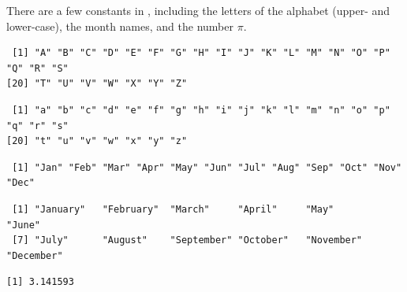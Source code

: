 There are a few constants in \R, including the letters of the alphabet (upper- and lower-case), the month names, and the number $\pi$.
\begin{knitrout}
\color{fgcolor}\begin{kframe}
\begin{alltt}
\end{alltt}
\begin{verbatim}
 [1] "A" "B" "C" "D" "E" "F" "G" "H" "I" "J" "K" "L" "M" "N" "O" "P" "Q" "R" "S"
[20] "T" "U" "V" "W" "X" "Y" "Z"
\end{verbatim}
\begin{alltt}
\end{alltt}
\begin{verbatim}
 [1] "a" "b" "c" "d" "e" "f" "g" "h" "i" "j" "k" "l" "m" "n" "o" "p" "q" "r" "s"
[20] "t" "u" "v" "w" "x" "y" "z"
\end{verbatim}
\begin{alltt}
\end{alltt}
\begin{verbatim}
 [1] "Jan" "Feb" "Mar" "Apr" "May" "Jun" "Jul" "Aug" "Sep" "Oct" "Nov" "Dec"
\end{verbatim}
\begin{alltt}
\end{alltt}
\begin{verbatim}
 [1] "January"   "February"  "March"     "April"     "May"       "June"     
 [7] "July"      "August"    "September" "October"   "November"  "December" 
\end{verbatim}
\begin{alltt}
\end{alltt}
\begin{verbatim}
[1] 3.141593
\end{verbatim}
\end{kframe}
\end{knitrout}

